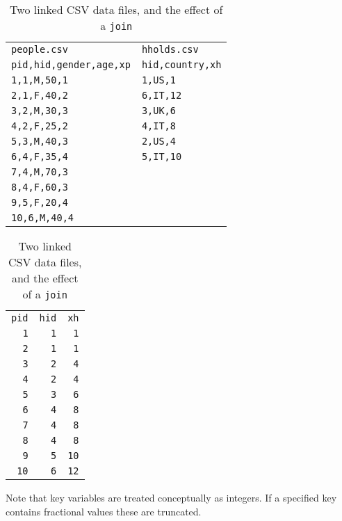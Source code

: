 \begin{table}[thbp]
\begin{center}
\setlength{\tabcolsep}{4em}
\begin{tabular}{ll}
\texttt{people.csv} & \texttt{hholds.csv} \\[6pt]
\texttt{pid,hid,gender,age,xp} & \texttt{hid,country,xh} \\
\texttt{1,1,M,50,1} & \texttt{1,US,1} \\
\texttt{2,1,F,40,2} & \texttt{6,IT,12} \\
\texttt{3,2,M,30,3} & \texttt{3,UK,6} \\
\texttt{4,2,F,25,2} & \texttt{4,IT,8} \\
\texttt{5,3,M,40,3} & \texttt{2,US,4} \\
\texttt{6,4,F,35,4} & \texttt{5,IT,10} \\
\texttt{7,4,M,70,3} \\
\texttt{8,4,F,60,3} \\
\texttt{9,5,F,20,4} \\
\texttt{10,6,M,40,4}
\end{tabular}

\vspace{1em}

\begin{tabular}{rrr}
  \texttt{pid}  & \texttt{hid}   &  \texttt{xh} \\[6pt]
    \texttt{1}  &  \texttt{1}    &   \texttt{1} \\
    \texttt{2}  &  \texttt{1}    &   \texttt{1} \\
    \texttt{3}  &  \texttt{2}    &   \texttt{4} \\
    \texttt{4}  &  \texttt{2}    &   \texttt{4} \\
    \texttt{5}  &  \texttt{3}    &   \texttt{6} \\
    \texttt{6}  &  \texttt{4}    &   \texttt{8} \\
    \texttt{7}  &  \texttt{4}    &   \texttt{8} \\
    \texttt{8}  &  \texttt{4}    &   \texttt{8} \\
    \texttt{9}  &  \texttt{5}    &  \texttt{10} \\
   \texttt{10}  &  \texttt{6}    &  \texttt{12}
\end{tabular}
\caption{Two linked CSV data files, and the effect of a \texttt{join}}
\label{tab:csv}
\end{center}
\end{table}

Note that key variables are treated conceptually as integers. If a
specified key contains fractional values these are truncated.

